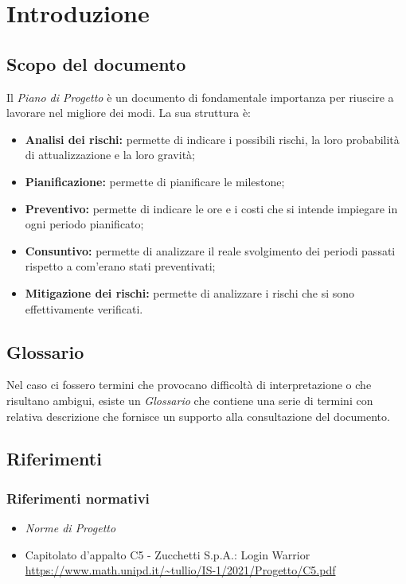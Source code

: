 \chapter{Introduzione}

\section{Scopo del documento}

Il \textit{Piano di Progetto} è un documento di fondamentale importanza per riuscire a lavorare nel migliore dei
modi. La sua struttura è:
\begin{itemize}
    \item \textbf{Analisi dei rischi: } permette di indicare i possibili rischi, la loro probabilità di attualizzazione e la loro gravità;
    \item \textbf{Pianificazione: } permette di pianificare le milestone;
    \item \textbf{Preventivo: } permette di indicare le ore e i costi che si intende impiegare in ogni periodo pianificato;
    \item \textbf{Consuntivo: } permette di analizzare il reale svolgimento dei periodi passati rispetto a com'erano stati preventivati;
    \item \textbf{Mitigazione dei rischi: } permette di analizzare i rischi che si sono effettivamente verificati. 
\end{itemize}

\section{Glossario}

Nel caso ci fossero termini che provocano difficoltà di interpretazione o che risultano ambigui, esiste un \textit{Glossario}
che contiene una serie di termini con relativa descrizione che fornisce un supporto alla consultazione del documento.

\section{Riferimenti}
\subsection{Riferimenti normativi}
\begin{itemize}
  \item \textit{Norme di Progetto}
  \item Capitolato d'appalto C5 - Zucchetti S.p.A.: Login Warrior \\
  \url{https://www.math.unipd.it/~tullio/IS-1/2021/Progetto/C5.pdf}
\end{itemize}

